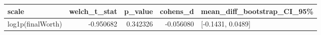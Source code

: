 \begin{tabular}{lrrrl}
\toprule
scale & welch\_t\_stat & p\_value & cohens\_d & mean\_diff\_bootstrap\_CI\_95\% \\
\midrule
log1p(finalWorth) & -0.950682 & 0.342326 & -0.056080 & [-0.1431, 0.0489] \\
\bottomrule
\end{tabular}
